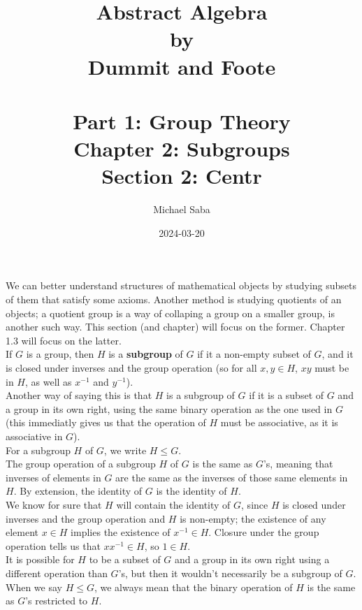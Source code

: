 \documentclass[12pt]{article}
\title{%
    \Huge Abstract Algebra \\
    \large by \\
    \Large Dummit and Foote \\~\\
    \huge Part 1: Group Theory \\
    \LARGE Chapter 2: Subgroups \\
    \Large Section 2: Centr
}
\date{2024-03-20}
\author{Michael Saba}
\begin{document}
    \maketitle
    \newpage

    
    We can better understand structures of mathematical objects
    by studying subsets of them that satisfy some axioms.
    Another method is studying quotients of an objects;
    a quotient group is a way of collaping a group on a smaller group,
    is another such way.
    This section (and chapter) will focus on the former.
    Chapter 1.3 will focus on the latter. \\
    
    If $G$ is a group, then $H$ is a \textbf{subgroup} of $G$
    if it a non-empty subset of $G$, and it is closed under
    inverses and the group operation
    (so for all $x, y \in H$, $xy$ must be in $H$,
    as well as $x^{-1}$ and $y^{-1}$). \\
    Another way of saying this is that $H$ is a subgroup of $G$
    if it is a subset of $G$ and a group in its own right,
    using the same binary operation as the one used in $G$
    (this immediatly gives us that the operation of $H$
    must be associative, as it is associative in $G$). \\
    For a subgroup $H$ of $G$, we write $H \leqslant G$. \\

    The group operation of a subgroup $H$ of $G$ is the same as $G$'s,
    meaning that inverses of elements in $G$
    are the same as the inverses of those same elements in $H$.
    By extension, the identity of $G$ is the identity of $H$. \\
    We know for sure that $H$ will contain the identity of $G$,
    since $H$ is closed under inverses and the group operation
    and $H$ is non-empty;
    the existence of any element $x \in H$ implies
    the existence of $x^{-1} \in H$.
    Closure under the group operation tells us that $xx^{-1} \in H$,
    so $1 \in H$. \\

    It is possible for $H$ to be a subset of $G$
    and a group in its own right using a different operation than $G$'s,
    but then it wouldn't necessarily be a subgroup of $G$.
    When we say $H \leqslant G$,
    we always mean that the binary operation of $H$ is the same as $G$'s
    restricted to $H$. \\
\end{document}
